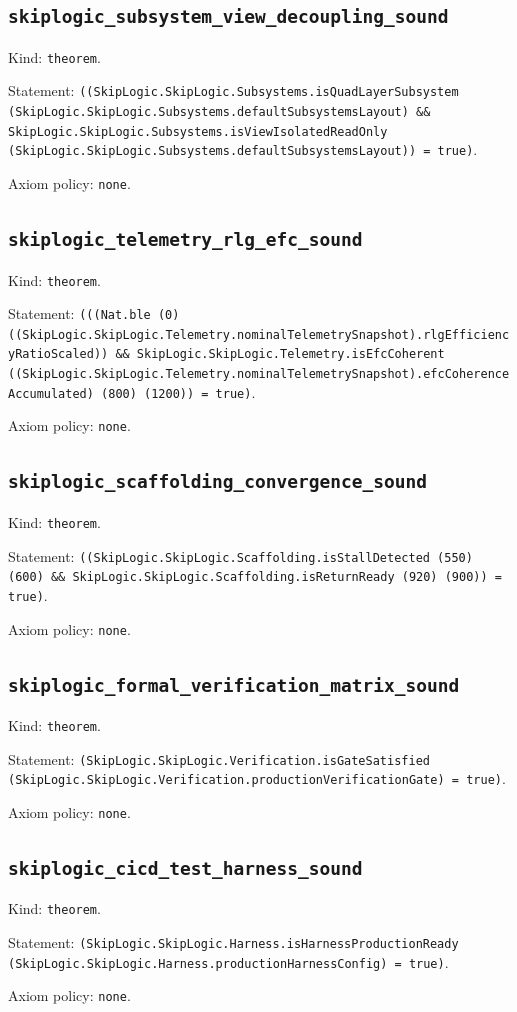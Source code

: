 \documentclass[11pt]{article}
\begin{document}
\subsection*{\texttt{skiplogic\_subsystem\_view\_decoupling\_sound}}
\noindent Kind: \texttt{theorem}.\par
\noindent Statement: \texttt{((SkipLogic.SkipLogic.Subsystems.isQuadLayerSubsystem (SkipLogic.SkipLogic.Subsystems.defaultSubsystemsLayout) \&\& SkipLogic.SkipLogic.Subsystems.isViewIsolatedReadOnly (SkipLogic.SkipLogic.Subsystems.defaultSubsystemsLayout)) = true)}.\par
\noindent Axiom policy: \texttt{none}.\par
\subsection*{\texttt{skiplogic\_telemetry\_rlg\_efc\_sound}}
\noindent Kind: \texttt{theorem}.\par
\noindent Statement: \texttt{(((Nat.ble (0) ((SkipLogic.SkipLogic.Telemetry.nominalTelemetrySnapshot).rlgEfficiencyRatioScaled)) \&\& SkipLogic.SkipLogic.Telemetry.isEfcCoherent ((SkipLogic.SkipLogic.Telemetry.nominalTelemetrySnapshot).efcCoherenceAccumulated) (800) (1200)) = true)}.\par
\noindent Axiom policy: \texttt{none}.\par
\subsection*{\texttt{skiplogic\_scaffolding\_convergence\_sound}}
\noindent Kind: \texttt{theorem}.\par
\noindent Statement: \texttt{((SkipLogic.SkipLogic.Scaffolding.isStallDetected (550) (600) \&\& SkipLogic.SkipLogic.Scaffolding.isReturnReady (920) (900)) = true)}.\par
\noindent Axiom policy: \texttt{none}.\par
\subsection*{\texttt{skiplogic\_formal\_verification\_matrix\_sound}}
\noindent Kind: \texttt{theorem}.\par
\noindent Statement: \texttt{(SkipLogic.SkipLogic.Verification.isGateSatisfied (SkipLogic.SkipLogic.Verification.productionVerificationGate) = true)}.\par
\noindent Axiom policy: \texttt{none}.\par
\subsection*{\texttt{skiplogic\_cicd\_test\_harness\_sound}}
\noindent Kind: \texttt{theorem}.\par
\noindent Statement: \texttt{(SkipLogic.SkipLogic.Harness.isHarnessProductionReady (SkipLogic.SkipLogic.Harness.productionHarnessConfig) = true)}.\par
\noindent Axiom policy: \texttt{none}.\par
\end{document}
